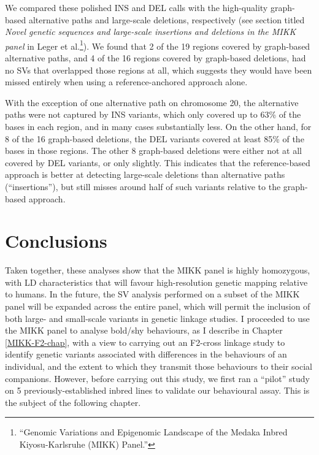 \documentclass[
  9pt,
]{book}
\begin{document}
We compared these polished INS and DEL calls with the high-quality graph-based alternative paths and large-scale deletions, respectively (see section titled \emph{Novel genetic sequences and large-scale insertions and deletions in the MIKK panel} in Leger et al.\footnote{{``Genomic Variations and Epigenomic Landscape of the {Medaka Inbred Kiyosu-Karlsruhe} ({MIKK}) Panel.''}}). We found that 2 of the 19 regions covered by graph-based alternative paths, and 4 of the 16 regions covered by graph-based deletions, had no SVs that overlapped those regions at all, which suggests they would have been missed entirely when using a reference-anchored approach alone.

With the exception of one alternative path on chromosome 20, the alternative paths were not captured by INS variants, which only covered up to 63\% of the bases in each region, and in many cases substantially less. On the other hand, for 8 of the 16 graph-based deletions, the DEL variants covered at least 85\% of the bases in those regions. The other 8 graph-based deletions were either not at all covered by DEL variants, or only slightly. This indicates that the reference-based approach is better at detecting large-scale deletions than alternative paths (``insertions''), but still misses around half of such variants relative to the graph-based approach.

\hypertarget{conclusions}{%
\section{Conclusions}\label{conclusions}}

Taken together, these analyses show that the MIKK panel is highly homozygous, with LD characteristics that will favour high-resolution genetic mapping relative to humans. In the future, the SV analysis performed on a subset of the MIKK panel will be expanded across the entire panel, which will permit the inclusion of both large- and small-scale variants in genetic linkage studies. I proceeded to use the MIKK panel to analyse bold/shy behaviours, as I describe in Chapter \ref{MIKK-F2-chap}, with a view to carrying out an F2-cross linkage study to identify genetic variants associated with differences in the behaviours of an individual, and the extent to which they transmit those behaviours to their social companions. However, before carrying out this study, we first ran a ``pilot'' study on 5 previously-established inbred lines to validate our behavioural assay. This is the subject of the following chapter.
\end{document}
